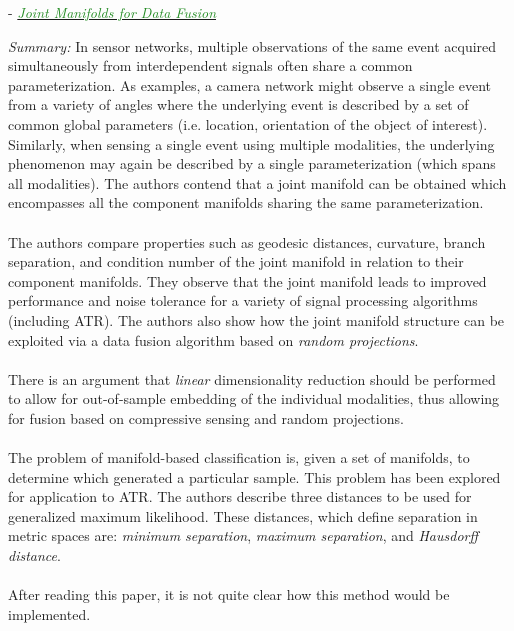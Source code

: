 \documentclass[]{article}
\newcommand{\paperentry}[4]{
            \hangindent=1cm
            \textcolor{red}{\cite{#1}} - \href{run:../References/#3}{\textcolor{ForestGreen}{\textit{#2}}}
            
            \noindent            
            \begin{minipage}[t]{0.1\linewidth}\hfill\end{minipage}
            \begin{minipage}[t]{0.8\linewidth}\textcolor{NavyBlue}{{\textit{Summary:}}}#4\end{minipage}
            \vspace{.25cm}
          }
\begin{document}
		
		\paperentry{Davenport2010JointManifoldsDataFusion}
		{Joint Manifolds for Data Fusion}
		{Manifold_Representation_Learning/Alignment/Davenport2010JointManifoldsDataFusion.pdf}
		{ In sensor networks, multiple observations of the same event acquired simultaneously from interdependent signals often share a common parameterization.  As examples, a camera network might observe a single event from a variety of angles where the underlying event is described by a set of common global parameters (i.e. location, orientation of the object of interest).  Similarly, when sensing a single event using multiple modalities, the underlying phenomenon may again be described by a single parameterization (which spans all modalities).  The authors contend that a joint manifold can be obtained which encompasses all the component manifolds sharing the same parameterization.
		\\ \\
		The authors compare properties such as geodesic distances, curvature, branch separation, and condition number of the joint manifold in relation to their component manifolds.  They observe that the joint manifold leads to improved performance and noise tolerance for a variety of signal processing algorithms (including ATR). The authors also show how the joint manifold structure can be exploited via a data fusion algorithm based on \textit{random projections}.
		\\ \\
		There is an argument that \textit{linear} dimensionality reduction should be performed to allow for out-of-sample embedding of the individual modalities, thus allowing for fusion based on compressive sensing and random projections.
		\\ \\
		The problem of manifold-based classification is, given a set of manifolds, to determine which generated a particular sample.  This problem has been explored for application to ATR. The authors describe three distances to be used for generalized maximum likelihood.  These distances, which define separation in metric spaces are: \textit{minimum separation}, \textit{maximum separation}, and \textit{Hausdorff distance}.
		\\ \\
		After reading this paper, it is not quite clear how this method would be implemented. 
		} \\
		
\end{document}
